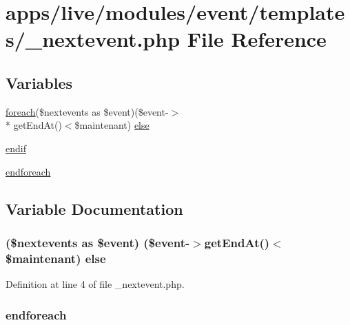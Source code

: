 \hypertarget{live_2modules_2event_2templates_2__nextevent_8php}{\section{apps/live/modules/event/templates/\-\_\-nextevent.php File Reference}
\label{live_2modules_2event_2templates_2__nextevent_8php}
}
\subsection*{Variables}
\begin{DoxyCompactItemize}
\item 
\hyperlink{presse_2modules_2news_2templates_2index_success_8php_abc56db52b2e9a59bcd5c9e45ac5cb332}{foreach}(\$nextevents as \$event)(\$event-\/$>$\\*
get\-End\-At()$<$\$maintenant) \hyperlink{live_2modules_2event_2templates_2__nextevent_8php_a9be22ad6cfbc26d33c7d6633e0b7a8aa}{else}
\item 
\hyperlink{live_2modules_2event_2templates_2__nextevent_8php_a82cd33ca97ff99f2fcc5e9c81d65251b}{endif}
\item 
\hyperlink{live_2modules_2event_2templates_2__nextevent_8php_a672d9707ef91db026c210f98cc601123}{endforeach}
\end{DoxyCompactItemize}


\subsection{Variable Documentation}
\hypertarget{live_2modules_2event_2templates_2__nextevent_8php_a9be22ad6cfbc26d33c7d6633e0b7a8aa}{
\subsubsection[{else}]{ (\$nextevents as \$event) (\$event-\/$>$get\-End\-At()$<$\$maintenant) else}}\label{live_2modules_2event_2templates_2__nextevent_8php_a9be22ad6cfbc26d33c7d6633e0b7a8aa}


Definition at line 4 of file \-\_\-nextevent.\-php.

\hypertarget{live_2modules_2event_2templates_2__nextevent_8php_a672d9707ef91db026c210f98cc601123}{
\subsubsection[{endforeach}]{\setlength{\rightskip}{0pt plus 5cm}endforeach}}\label{live_2modules_2event_2templates_2__nextevent_8php_a672d9707ef91db026c210f98cc601123}



